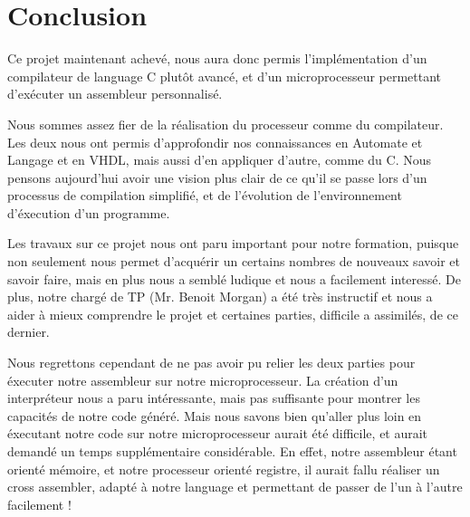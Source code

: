 \section{Conclusion}
    Ce projet maintenant achevé, nous aura donc permis l'implémentation d'un compilateur de language C plutôt avancé, et d'un microprocesseur permettant d'exécuter un assembleur personnalisé.
    
    Nous sommes assez fier de la réalisation du processeur comme du compilateur. Les deux nous ont permis d'approfondir nos connaissances en Automate et Langage et en VHDL, mais aussi d'en appliquer d'autre, comme du C. Nous pensons aujourd'hui avoir une vision plus clair de ce qu'il se passe lors d'un processus de compilation simplifié, et de l'évolution de l'environnement d'éxecution d'un programme.
    
    Les travaux sur ce projet nous ont paru important pour notre formation, puisque non seulement nous permet d'acquérir un certains nombres de nouveaux savoir et savoir faire, mais en plus nous a semblé ludique et nous a facilement interessé. De plus, notre chargé de TP (Mr. Benoit Morgan) a été très instructif et nous a aider à mieux comprendre le projet et certaines parties, difficile a assimilés, de ce dernier.
    
    Nous regrettons cependant de ne pas avoir pu relier les deux parties pour éxecuter notre assembleur sur notre microprocesseur. La création d'un interpréteur nous a paru intéressante, mais pas suffisante pour montrer les capacités de notre code généré. Mais nous savons bien qu'aller plus loin en éxecutant notre code sur notre microprocesseur aurait été difficile, et aurait demandé un temps supplémentaire considérable. En effet, notre assembleur étant orienté mémoire, et notre processeur orienté registre, il aurait fallu réaliser un cross assembler, adapté à notre language et permettant de passer de l'un à l'autre facilement !